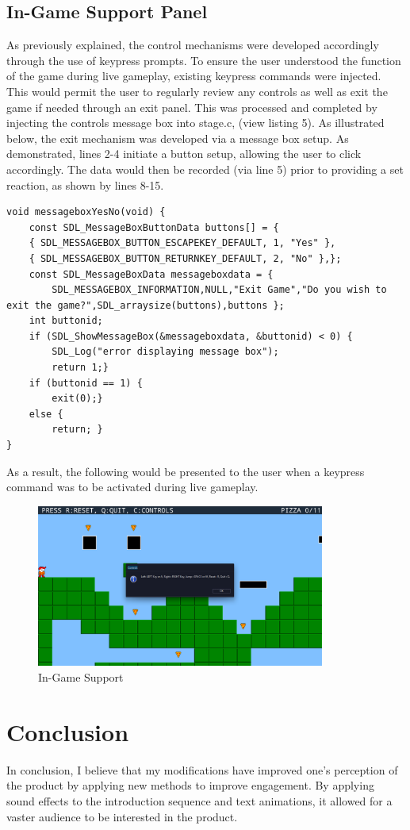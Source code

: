 \documentclass{article}
\begin{document}
\subsection{In-Game Support Panel}
As previously explained, the control mechanisms were developed accordingly through the use of keypress prompts. To ensure the user understood the function of the game during live gameplay, existing keypress commands were injected. This would permit the user to regularly review any controls as well as exit the game if needed through an exit panel. This was processed and completed by injecting the controls message box into stage.c, (view listing 5). As illustrated below, the exit mechanism was developed via a message box setup. As demonstrated, lines 2-4 initiate a button setup, allowing the user to click accordingly. The data would then be recorded (via line 5) prior to providing a set reaction, as shown by lines 8-15.
\begin{lstlisting}[caption={Exit Message Box},captionpos=b]
void messageboxYesNo(void) {
	const SDL_MessageBoxButtonData buttons[] = {
	{ SDL_MESSAGEBOX_BUTTON_ESCAPEKEY_DEFAULT, 1, "Yes" },
	{ SDL_MESSAGEBOX_BUTTON_RETURNKEY_DEFAULT, 2, "No" },};
	const SDL_MessageBoxData messageboxdata = {
		SDL_MESSAGEBOX_INFORMATION,NULL,"Exit Game","Do you wish to exit the game?",SDL_arraysize(buttons),buttons };
	int buttonid;
	if (SDL_ShowMessageBox(&messageboxdata, &buttonid) < 0) {
		SDL_Log("error displaying message box");
		return 1;}
	if (buttonid == 1) {
		exit(0);}
	else {
		return;	}
}
\end{lstlisting}
As a result, the following would be presented to the user when a keypress command was to be activated during live gameplay.
\begin{figure}[H]
    \centering
    \includegraphics[height=2.1in]{ingamecontrol.png}
    \caption[In-Game Support]{In-Game Support}
    \label{fig:support}
\end{figure}

\section{Conclusion}
In conclusion, I believe that my modifications have improved one's perception of the product by applying new methods to improve engagement. By applying sound effects to the introduction sequence and text animations, it allowed for a vaster audience to be interested in the product.
\end{document}
